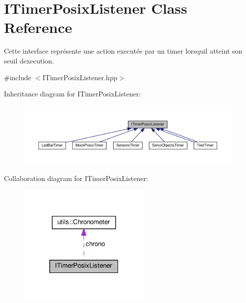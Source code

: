 \hypertarget{classITimerPosixListener}{}\section{I\+Timer\+Posix\+Listener Class Reference}
\label{classITimerPosixListener}


Cette interface représente une action executée par un timer lorsqu\textquotesingle{}il atteint son seuil d\textquotesingle{}execution.  




{\ttfamily \#include $<$I\+Timer\+Posix\+Listener.\+hpp$>$}



Inheritance diagram for I\+Timer\+Posix\+Listener\+:
\nopagebreak
\begin{figure}[H]
\begin{center}
\leavevmode
\includegraphics[width=350pt]{classITimerPosixListener__inherit__graph}
\end{center}
\end{figure}


Collaboration diagram for I\+Timer\+Posix\+Listener\+:
\nopagebreak
\begin{figure}[H]
\begin{center}
\leavevmode
\includegraphics[width=184pt]{classITimerPosixListener__coll__graph}
\end{center}
\end{figure}
